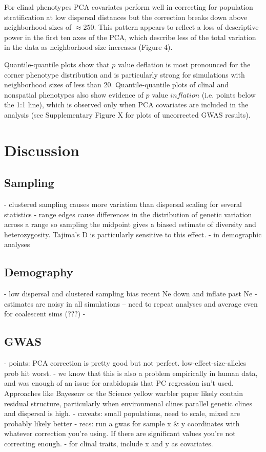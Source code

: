 \documentclass[9pt,twocolumn,twoside,lineno]{gsajnl}
\begin{document}
For clinal phenotypes PCA covariates perform well in correcting for population stratification at low dispersal distances but the correction breaks down above neighborhood sizes of $\approx250$. This pattern appears to reflect a loss of descriptive power in the first ten axes of the PCA, which describe less of the total variation in the data as neighborhood size increases (Figure 4). 

Quantile-quantile plots show that $p$ value deflation is most pronounced for the corner phenotype distribution and is particularly strong for simulations with neighborhood sizes of less than 20. Quantile-quantile plots of clinal and nonspatial phenotypes also show evidence of $p$ value $inflation$ (i.e. points below the 1:1 line), which is observed only when PCA covariates are included in the analysis (see Supplementary Figure X for plots of uncorrected GWAS results). 

\section{Discussion}

\subsection{Sampling}

- clustered sampling causes more variation than dispersal scaling for several statistics
- range edges cause differences in the distribution of genetic variation across a range so sampling the midpoint gives a biased estimate of diversity and heterozygosity. Tajima's D is particularly sensitive to this effect. 
- in demographic analyses 

\subsection{Demography}
- low dispersal and clustered sampling bias recent Ne down and inflate past Ne
- estimates are noisy in all simulations -- need to repeat analyses and average even for coalescent sims (???)
- 

\subsection{GWAS}

- points: PCA correction is pretty good but not perfect. low-effect-size-alleles prob hit worst. 
- we know that this is also a problem empirically in human data, and was enough of an issue for arabidopsis that PC regression isn't used. Approaches like Bayesenv or the Science yellow warbler paper likely contain residual structure, particularly when environmenal clines parallel genetic clines and dispersal is high. 
- caveats: small populations, need to scale, mixed are probably likely better
- recs: run a gwas for sample x & y coordinates with whatever correction you're using. If there are significant values you're not correcting enough.
- for clinal traits, include x and y as covariates. 
\end{document}
